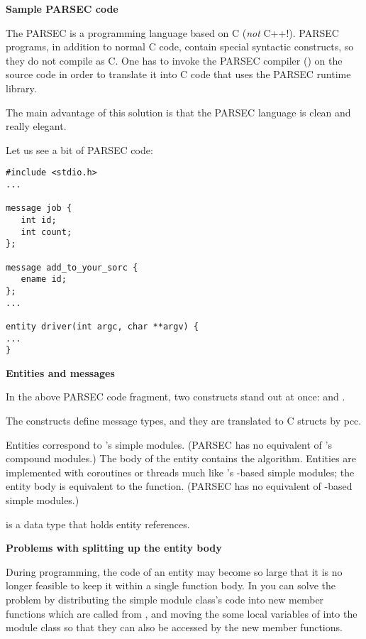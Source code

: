 \textbf{Sample PARSEC code}


The PARSEC is a programming language based on C (\textit{not} C++!).
PARSEC programs, in addition to normal C code, contain special
syntactic constructs, so they do not compile as C. One has to
invoke the PARSEC compiler () on the source code in order
to translate it into C code that uses the PARSEC runtime library.


The main advantage of this solution is that the PARSEC language
is clean and really elegant.


Let us see a bit of PARSEC code:

\begin{verbatim}
#include <stdio.h>
...

message job {
   int id;
   int count;
};

message add_to_your_sorc {
   ename id;
};
...

entity driver(int argc, char **argv) {
...
}
\end{verbatim}

\textbf{Entities and messages}


In the above PARSEC code fragment, two constructs stand out at
once:  and .

The  constructs define message types, and they are translated
to C structs by pcc.


Entities correspond to {\opp}'s simple modules.
(PARSEC has no equivalent of {\opp}'s compound
modules.) The body of the entity contains the algorithm. Entities are
implemented with coroutines or threads much like {\opp}'s
-based simple modules; the
entity body is equivalent to the  function.  (PARSEC
has no equivalent of -based
simple modules.)


 is a data type that holds entity references.


\textbf{Problems with splitting up the entity body}


During programming, the code of an entity may become so large
that it is no longer feasible to keep it within a single function
body. In {\opp} you can solve the problem by distributing the
simple module class's  code into new member functions
which are called from , and moving the some local variables
of  into the module class so that they can also be
accessed by the new member functions.

